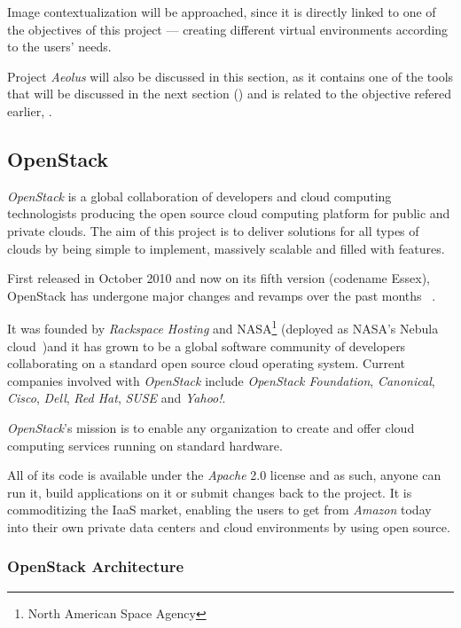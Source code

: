 Image contextualization will be approached, since it is directly linked to one of the objectives of this project --- creating different virtual environments according to the users' needs.

Project \textit{Aeolus} will also be discussed in this section, as it contains one of the tools that will be discussed in the next section () and is related to the objective refered earlier, .

\subsection{OpenStack}\label{subsec:openstack}

\textit{OpenStack} is a global collaboration of developers and cloud computing technologists producing the open source cloud computing platform for public and private clouds. The aim of this project is to deliver solutions for all types of clouds by being simple to implement, massively scalable and filled with features. 

First released in October 2010 and now on its fifth version (codename Essex), OpenStack has undergone major changes and revamps over the past months ~\cite{openstack}.

It was founded by \textit{Rackspace Hosting} and NASA\footnote{North American Space Agency} (deployed as NASA's Nebula cloud~\cite{nasa-nebula})and it has grown to be a global software community of developers collaborating on a standard open source cloud operating system. Current companies involved with \textit{OpenStack} include \textit{OpenStack Foundation}, \textit{Canonical}, \textit{Cisco}, \textit{Dell}, \textit{Red Hat}, \textit{SUSE} and \textit{Yahoo!}. \cite{stackgithub}

\textit{OpenStack}'s mission is to enable any organization to create and offer cloud computing services running on standard hardware.

All of its code is available under the \textit{Apache} 2.0 license and as such, anyone can run it, build applications on it or submit changes back to the project. It is commoditizing the IaaS market, enabling the users to get from \textit{Amazon} today into their own private data centers and cloud environments by using open source. \cite{stackgithub}

\subsubsection{OpenStack Architecture}\label{subsubsec:openstack_arch}
  
